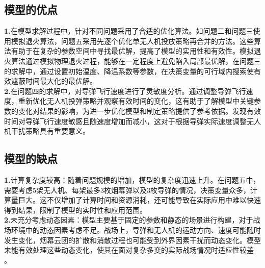 \documentclass[../main.tex]{subfiles}
\begin{document}
\subsection{模型的优点\cite{doubao}}
\noindent\textbf{1.}在模型求解过程中，针对不同问题采用了合适的优化算法。如问题二和问题三使用模拟退火算法，问题五采用先逐个优化单无人机投放策略再合并的方法。这些算法有助于在复杂的参数空间中寻找最优解，提高了模型的实用性和有效性。模拟退火算法通过模拟物理退火过程，能够在一定程度上避免陷入局部最优解，在问题三的求解中，通过设置初始温度、降温系数等参数，在决策变量的可行域内搜索使有效遮蔽时间最大化的最优解。
\\
\textbf{2.}在问题四的求解中，对导弹飞行速度进行了灵敏度分析。通过调整导弹飞行速度，重新优化无人机投弹策略并观察有效时间的变化，这有助于了解模型中关键参数的变化对结果的影响，为进一步优化模型和制定策略提供了参考依据。发现有效时间对导弹飞行速度敏感且随速度增加而减小，这对于根据导弹实际速度调整无人机干扰策略具有重要意义。


\subsection{模型的缺点\cite{doubao}}
\noindent\textbf{1.}计算复杂度较高：随着问题规模的增加，模型的复杂度迅速上升。在问题五中，需要考虑5架无人机、每架最多3枚烟幕弹以及3枚导弹的情况，决策变量众多，计算量巨大。这不仅增加了计算时间和资源消耗，还可能导致在实际应用中难以快速得到结果，限制了模型的实时性和应用范围。
\\
\textbf{2.}未充分考虑动态因素：模型主要基于固定的参数和静态的场景进行构建，对于战场环境中的动态因素考虑不足。战场上，导弹和无人机的运动方向、速度可能随时发生变化，烟幕云团的扩散和消散过程也可能受到外界因素干扰而动态变化。模型未能有效处理这些动态变化，使其在面对复杂多变的实际战场情况时适应性较差 。 
\end{document}
